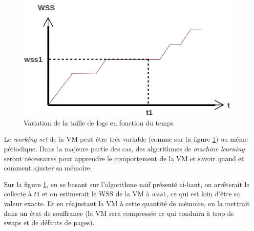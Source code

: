 \begin{figure}[H]
    \centering
    \includegraphics[scale=.5]{chapters/3/fig3/courbe_wss_2}
    \caption{Variation de la taille de logs en fonction du temps}
    \label{fig:courbe_wss_var}
\end{figure}

\noindent Le \textit{working set} de la VM peut être très variable (comme sur la figure \ref{fig:courbe_wss_var}) ou même périodique. Dans la majeure partie des cas, des algorithmes de \textit{machine learning} seront nécessaires pour apprendre le comportement de la VM et savoir quand et comment ajuster sa mémoire.

\noindent Sur la figure \ref{fig:courbe_wss_var}, en se basant sur l'algorithme naïf présenté ci-haut, on arrêterait la collecte à $t1$ et on estimerait le WSS de la VM à $wss1$, ce qui est loin d'être sa valeur exacte. Et en réajustant la VM à cette quantité de mémoire, on la mettrait dans un état de souffrance (la VM sera compressée ce qui conduira à trop de swaps et de défauts de pages).